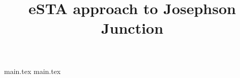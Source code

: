\documentclass{article}
\title{eSTA approach to Josephson Junction}
\date{}
\author{}
\begin{document}

\maketitle

{main.tex}
{main.tex}
%
%
%

\end{document}
